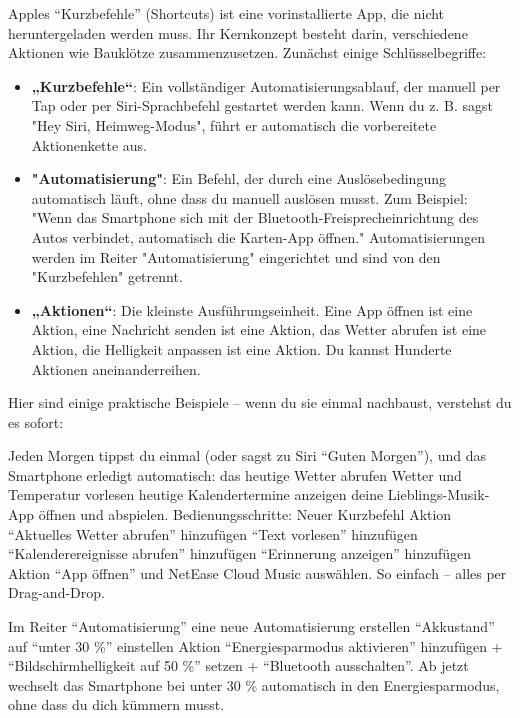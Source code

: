 
Apples “Kurzbefehle” (Shortcuts) ist eine vorinstallierte App, die nicht heruntergeladen werden muss. Ihr Kernkonzept besteht darin, verschiedene Aktionen wie Bauklötze zusammenzusetzen. Zunächst einige Schlüsselbegriffe:

\begin{itemize}
  \item \textbf{„Kurzbefehle“}: Ein vollständiger Automatisierungsablauf, der manuell per Tap oder per Siri-Sprachbefehl gestartet werden kann. Wenn du z. B. sagst "Hey Siri, Heimweg-Modus", führt er automatisch die vorbereitete Aktionenkette aus.
  \item \textbf{"Automatisierung"}: Ein Befehl, der durch eine Auslösebedingung automatisch läuft, ohne dass du manuell auslösen musst. Zum Beispiel: "Wenn das Smartphone sich mit der Bluetooth-Freisprecheinrichtung des Autos verbindet, automatisch die Karten-App öffnen." Automatisierungen werden im Reiter "Automatisierung" eingerichtet und sind von den "Kurzbefehlen" getrennt.
  \item \textbf{„Aktionen“}: Die kleinste Ausführungseinheit. Eine App öffnen ist eine Aktion, eine Nachricht senden ist eine Aktion, das Wetter abrufen ist eine Aktion, die Helligkeit anpassen ist eine Aktion. Du kannst Hunderte Aktionen aneinanderreihen.
\end{itemize}

Hier sind einige praktische Beispiele – wenn du sie einmal nachbaust, verstehst du es sofort:


Jeden Morgen tippst du einmal (oder sagst zu Siri “Guten Morgen”), und das Smartphone erledigt automatisch: das heutige Wetter abrufen Wetter und Temperatur vorlesen heutige Kalendertermine anzeigen deine Lieblings-Musik-App öffnen und abspielen. Bedienungsschritte: Neuer Kurzbefehl Aktion “Aktuelles Wetter abrufen” hinzufügen “Text vorlesen” hinzufügen “Kalenderereignisse abrufen” hinzufügen “Erinnerung anzeigen” hinzufügen Aktion “App öffnen” und NetEase Cloud Music auswählen. So einfach – alles per Drag-and-Drop.


Im Reiter “Automatisierung” eine neue Automatisierung erstellen “Akkustand” auf “unter 30 \%” einstellen Aktion “Energiesparmodus aktivieren” hinzufügen + “Bildschirmhelligkeit auf 50 \%” setzen + “Bluetooth ausschalten”. Ab jetzt wechselt das Smartphone bei unter 30 \% automatisch in den Energiesparmodus, ohne dass du dich kümmern musst.

